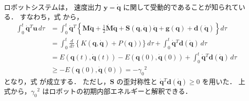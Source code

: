ロボットシステムは，
速度出力 $\bm{y} = \dot{\bm{q}}$ に関して受動的であることが知られている．
すなわち，式  から，
\begin{align}
	\int_0^t \dot{\bm{q}}{}^T \bm{u} \, d\tau
		&= \int_0^t \dot{\bm{q}}{}^T \left\{
			\bm{M} \ddot{\bm{q}}
			+ \frac{1}{2} \dot{\bm{M}} \dot{\bm{q}}
			+ \bm{S}(\bm{q},\dot{\bm{q}}) \dot{\bm{q}}
			+ \bm{g}(\bm{q})
			+ \bm{d}(\dot{\bm{q}}) \right\} d\tau													\nonumber \\
		&= \int_0^t \frac{d}{d\tau} \left\{ K(\bm{q},\dot{\bm{q}}) + P(\bm{q})) \right\} d\tau
			+ \int_0^t \dot{\bm{q}}{}^T \bm{d}(\dot{\bm{q}}) \, d\tau 								\nonumber \\
		&= E(\bm{q}(t),\dot{\bm{q}}(t)) - E(\bm{q}(0),\dot{\bm{q}}(0))
			+ \int_0^t \dot{\bm{q}}{}^T \bm{d}(\dot{\bm{q}}) \, d\tau 								\nonumber \\
		&\ge - E(\bm{q}(0),\dot{\bm{q}}(0)) = -\gamma_0{}^2											\label{eq:limit}
\end{align}
となり，式  が成立する．
ただし，$\bm{S}$ の歪対称性と $\dot{\bm{q}}{}^T \bm{d}(\dot{\bm{q}}) \ge 0$ を用いた．
上式から，$\gamma_0{}^2$ はロボットの初期内部エネルギーと解釈できる．
